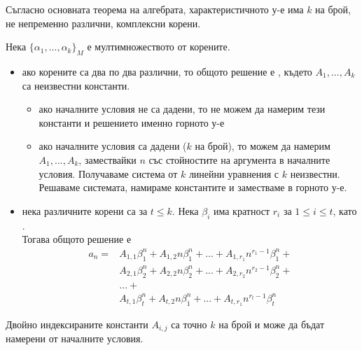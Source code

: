 Съгласно основната теорема на алгебрата, характеристичното у-е има \(k\) на брой, не непременно различни, 
комплексни корени.

Нека \(\{\alpha_1, ..., \alpha_k\}_M\) е мултимножеството от корените.

\begin{itemize}
    \item ако корените са два по два различни, то общото решение е , 
    където \(A_1, ..., A_k\) са неизвестни константи.
    \begin{itemize}
        \item ако началните условия не са дадени, то не можем да намерим тези константи и решението именно горното у-е
        \item ако началните условия са дадени (\(k\) на брой), то можем да намерим \(A_1, ..., A_k\), замествайки \(n\) 
        със стойностите на аргумента в началните условия. Получаваме система от \(k\) линейни уравнения с \(k\)
        неизвестни. Решаваме системата, намираме константите и заместваме в горното у-е.
    \end{itemize}
    \item нека различните корени са  за \(t \le k\).
    Нека \(\beta_i\) има кратност \(r_i\) за \(1 \le i \le t\), като . \\
    Тогава общото решение е
    \begin{align*}
        a_n = &A_{1, 1}\beta_1^n + A_{1, 2}n\beta_1^n + ... + A_{1, r_1}n^{r_1 - 1}\beta_1^n + \\
              &A_{2, 1}\beta_2^n + A_{2, 2}n\beta_2^n + ... + A_{2, r_2}n^{r_2 - 1}\beta_2^n + \\
              &... + \\
              &A_{t, 1}\beta_t^n + A_{t, 2}n\beta_1^n + ... + A_{t, r_1}n^{r_t - 1}\beta_t^n
    \end{align*}
\end{itemize}
Двойно индексираните константи \(A_{i, j}\) са точно \(k\) на брой и може да бъдат намерени от началните условия.

